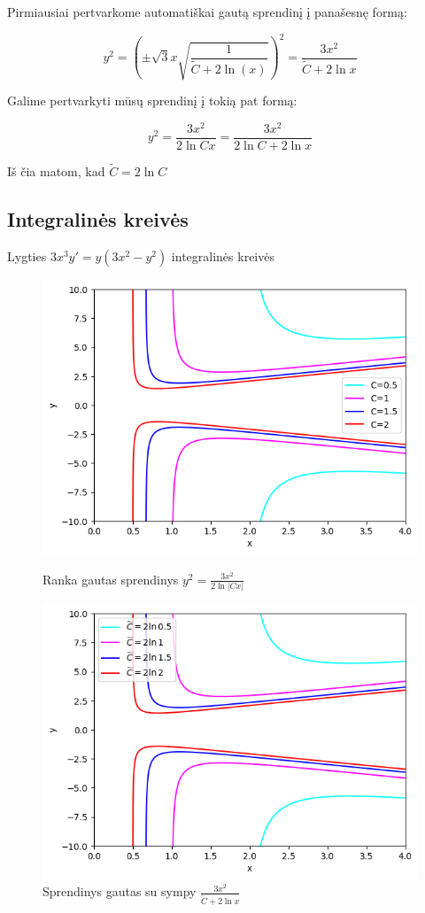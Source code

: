 \documentclass[11pt]{article}
\begin{document}
Pirmiausiai pertvarkome automatiškai gautą sprendinį į panašesnę formą:

\begin{equation}
y^2=\left(\pm\sqrt 3x\sqrt{\frac{1}{\widetilde{C}+2\ln(x)}}\right)^2=\frac{3x^2}{\widetilde{C}+2\ln x}
\end{equation}

Galime pertvarkyti mūsų sprendinį į tokią pat formą:

\begin{equation}
y^2=\frac{3x^2}{2\ln Cx}=\frac{3x^2}{2\ln C + 2\ln x}
\end{equation}

Iš čia matom, kad $\widetilde{C}=2\ln C$

\newpage
\subsection{Integralinės kreivės}

Lygties $3x^3y'=y(3x^2-y^2)$ integralinės kreivės

\begin{figure}[h!]
    \centering
    \begin{minipage}{0.75\textwidth}
        \centering
        \includegraphics[width=.7\linewidth]{2-updated-my.png}
        \caption{Ranka gautas sprendinys $y^2=\frac{3x^2}{2\ln|Cx|}$}\label{fig:pvz2}
    \end{minipage}\hfill

    \begin{minipage}{0.75\textwidth}
        \centering
        \includegraphics[width=.7\linewidth]{2-updated-sympy.png}
        \caption{Sprendinys gautas su sympy $\frac{3x^2}{\widetilde{C}+2\ln x}$}\label{fig:pvz3}
    \end{minipage}
\end{figure}
\end{document}
